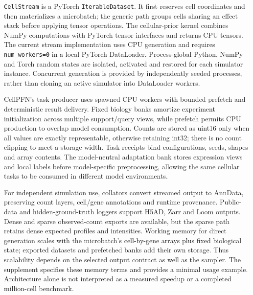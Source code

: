 \texttt{CellStream} is a PyTorch \texttt{IterableDataset}. It first reserves cell coordinates and then materializes a microbatch; the generic path groups cells sharing an effect stack before applying tensor operations. The cellular-prior kernel combines NumPy computations\cite{harris2020numpy} with PyTorch tensor interfaces and returns CPU tensors. The current stream implementation uses CPU generation and requires \texttt{num\_workers=0} in a local PyTorch DataLoader. Process-global Python, NumPy and Torch random states are isolated, activated and restored for each simulator instance. Concurrent generation is provided by independently seeded processes, rather than cloning an active simulator into DataLoader workers.

CellPFN's task producer uses spawned CPU workers with bounded prefetch and deterministic result delivery. Fixed biology banks amortize experiment initialization across multiple support/query views, while prefetch permits CPU production to overlap model consumption. Counts are stored as uint16 only when all values are exactly representable, otherwise retaining int32; there is no count clipping to meet a storage width. Task receipts bind configurations, seeds, shapes and array contents. The model-neutral adaptation bank stores expression views and local labels before model-specific preprocessing, allowing the same cellular tasks to be consumed in different model environments.

For independent simulation use, collators convert streamed output to AnnData\cite{virshup2024anndata}, preserving count layers, cell/gene annotations and runtime provenance. Public-data and hidden-ground-truth loggers support H5AD, Zarr and Loom outputs. Dense and sparse observed-count exports are available, but the sparse path retains dense expected profiles and intensities. Working memory for direct generation scales with the microbatch's cell-by-gene arrays plus fixed biological state; exported datasets and prefetched banks add their own storage. Thus scalability depends on the selected output contract as well as the sampler. The supplement specifies these memory terms and provides a minimal usage example. Architecture alone is not interpreted as a measured speedup or a completed million-cell benchmark.
